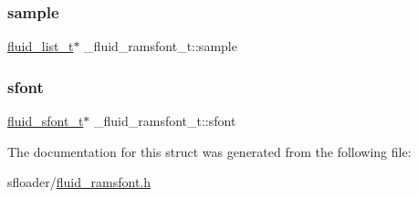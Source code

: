 \subsubsection{\texorpdfstring{sample}{sample}}
{\footnotesize\ttfamily \hyperlink{fluid__list_8h_a3ef7535d4290862c0af118569223bd89}{fluid\+\_\+list\+\_\+t}$\ast$ \+\_\+fluid\+\_\+ramsfont\+\_\+t\+::sample}

\mbox{\label{struct__fluid__ramsfont__t_acabf1ff179d18e270e5f47087c1b14ae}} 
\subsubsection{\texorpdfstring{sfont}{sfont}}
{\footnotesize\ttfamily \hyperlink{types_8h_aa6c18288f76608acbb10b80a153f4ab8}{fluid\+\_\+sfont\+\_\+t}$\ast$ \+\_\+fluid\+\_\+ramsfont\+\_\+t\+::sfont}



The documentation for this struct was generated from the following file\+:\begin{DoxyCompactItemize}
\item 
sfloader/\hyperlink{fluid__ramsfont_8h}{fluid\+\_\+ramsfont.\+h}\end{DoxyCompactItemize}
